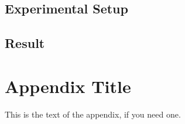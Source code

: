 \documentclass[12pt]{sigplanconf}
\begin{document}
\subsection{Experimental Setup}

\subsection{Result}

\appendix
\section{Appendix Title}

This is the text of the appendix, if you need one.




\end{document}
